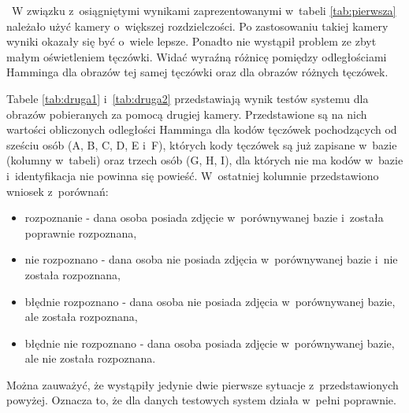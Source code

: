 ~W związku z~osiągniętymi wynikami zaprezentowanymi w~tabeli \ref{tab:pierwsza} należało użyć kamery o~większej rozdzielczości. Po zastosowaniu takiej kamery wyniki okazały się być o~wiele lepsze. Ponadto nie wystąpił problem ze zbyt małym oświetleniem tęczówki. Widać wyraźną różnicę pomiędzy odległościami Hamminga dla obrazów tej samej tęczówki oraz dla obrazów różnych tęczówek.

Tabele \ref{tab:druga1} i~\ref{tab:druga2} przedstawiają wynik testów systemu dla obrazów pobieranych za pomocą drugiej kamery. Przedstawione są na nich wartości obliczonych odległości Hamminga dla kodów tęczówek pochodzących od sześciu osób (A, B, C, D, E i~F), których kody tęczówek są już zapisane w~bazie (kolumny w~tabeli) oraz trzech osób (G, H, I), dla których nie ma kodów w~bazie i~identyfikacja nie powinna się powieść. W~ostatniej kolumnie przedstawiono wniosek z~porównań:
\begin{itemize}
\item rozpoznanie - dana osoba posiada zdjęcie w~porównywanej bazie i~została poprawnie rozpoznana,
\item nie rozpoznano - dana osoba nie posiada zdjęcia w~porównywanej bazie i~nie została rozpoznana,
\item błędnie rozpoznano - dana osoba nie posiada zdjęcia w~porównywanej bazie, ale została rozpoznana,
\item błędnie nie rozpoznano - dana osoba posiada zdjęcie w~porównywanej bazie, ale nie została rozpoznana.
\end{itemize}

Można zauważyć, że wystąpiły jedynie dwie pierwsze sytuacje z~przedstawionych powyżej. Oznacza to, że dla danych testowych system działa w~pełni poprawnie.

